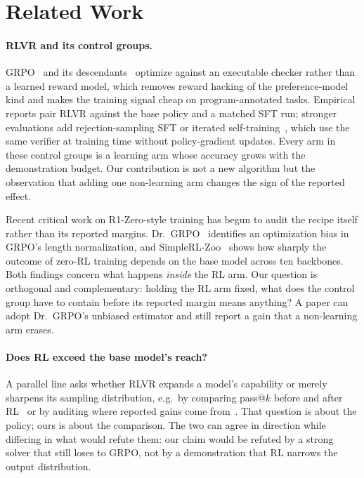 \section{Related Work}
\label{sec:related}

\paragraph{RLVR and its control groups.}
GRPO~\cite{grpo2024} and its descendants~\cite{deepseekr1} optimize against
an executable checker rather than a learned reward model, which removes reward
hacking of the preference-model kind and makes the training signal cheap on
program-annotated tasks. Empirical reports pair RLVR against the base policy
and a matched SFT run; stronger evaluations add rejection-sampling SFT or
iterated self-training~\cite{star2022,rft2023,restem2023}, which use the same
verifier at training time without policy-gradient updates. Every arm in these
control groups is a learning arm whose accuracy grows with the demonstration
budget. Our contribution is not a new algorithm but the observation that adding
one non-learning arm changes the sign of the reported effect.

Recent critical work on R1-Zero-style training has begun to audit the recipe
itself rather than its reported margins. Dr.\ GRPO~\cite{drgrpo2025} identifies
an optimization bias in GRPO's length normalization, and
SimpleRL-Zoo~\cite{simplerlzoo2025} shows how sharply the outcome of zero-RL
training depends on the base model across ten backbones. Both findings concern
what happens \emph{inside} the RL arm. Our question is orthogonal and
complementary: holding the RL arm fixed, what does the control group have to
contain before its reported margin means anything? A paper can adopt Dr.\ GRPO's
unbiased estimator and still report a gain that a non-learning arm erases.

\paragraph{Does RL exceed the base model's reach?}
A parallel line asks whether RLVR expands a model's capability or merely
sharpens its sampling distribution, e.g.\ by comparing pass@$k$ before and
after RL~\cite{yue2025limit} or by auditing where reported gains come
from~\cite{sober2025}. That question is about the policy; ours is about the
comparison. The two can agree in direction while differing in what would refute
them: our claim would be refuted by a strong solver that still loses to GRPO,
not by a demonstration that RL narrows the output distribution.

